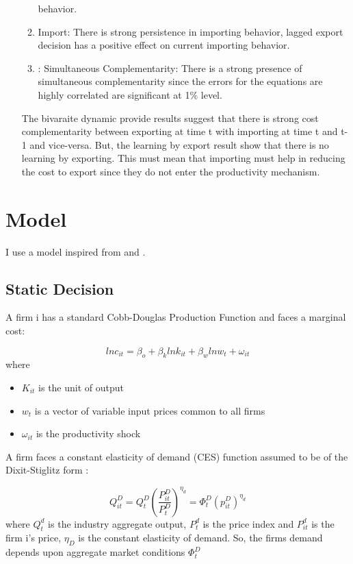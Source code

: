\documentclass[11pt]{article}
\begin{document}
\begin{itemize}
\begin{enumerate}
  behavior. 
\item Import: There is strong persistence in importing behavior,
  lagged export decision has a positive effect on current importing
  behavior. 
\item: Simultaneous Complementarity: There is a strong presence of
  simultaneous complementarity since the errors for the equations are
  highly correlated are significant at 1\% level.  
\end{enumerate}
The bivaraite dynamic provide  results suggest that there is strong cost complementarity
between exporting at time t with importing at time t and t-1 and
vice-versa. But, the learning by export result show that there is no
learning by exporting. This must mean that importing must help in
reducing the cost to export since they do not enter the productivity
mechanism. 

\end{itemize}

\section{Model}

I use a model inspired from  \cite{aw2011} and \cite{kasahara2013productivity}. 

\subsection{Static Decision}

A firm i has a standard Cobb-Douglas Production Function and faces a
marginal cost:

\begin{equation}
ln c_{it} = \beta_{o} + \beta_{k}ln k_{it} + \beta_{w}ln w_{t} + \omega_{it}
\end{equation}
where 
\begin{itemize}
\item $K_{it}$ is the unit of output
\item $w_{t}$ is a vector of variable input prices common to all firms
\item $\omega_{it}$ is the productivity shock
\end{itemize}

A firm faces a constant elasticity of demand (CES) function assumed to
be of the Dixit-Stiglitz form :

\begin{equation}
Q_{it}^{D} = Q_{t}^{D}(\frac{P_{it}^{D}}{P_{t}^{D}})^{\eta_{d}}= \Phi_{t}^{D} (p_{it}^{D})^{\eta_{d}}
\end{equation} 
where $Q_{t}^{d}$ is the industry aggregate output, $P_{t}^{d}$ is
the price index and $P_{it}^{d}$ is the firm i's price, $\eta_{D}$ is
the constant elasticity of demand. So, the firms demand depends upon
aggregate market conditions $\Phi_{t}^{D}$
\end{document}
